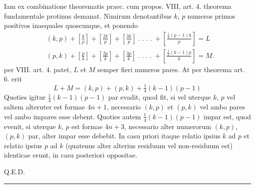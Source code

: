 \documentclass[14pt]{memoir}
\begin{document}
Iam ex combinatione theorematis praec. cum propos. VIII, art. 4. theorema fundamentale protinus demanat. Nimirum denotantibus \(k\), \(p\) numeros primos positivos inaequales quoscunque, et ponendo 
\begin{align*} &(k,p) + \left[\tfrac{k}{p}\right] + \left[\tfrac{2k}{p}\right] + \left[\tfrac{3k}{p}\right] \;.\;.\;.\;.\; + \left[\tfrac{\frac{1}{2}(p-1)k}{p}\right] = L \\
&(p,k) + \left[\tfrac{p}{k}\right] + \left[\tfrac{2p}{k}\right] + \left[\tfrac{3p}{k}\right] \;.\;.\;.\;.\; + \left[\tfrac{\frac{1}{2}(k-1)p}{k}\right] = M. \end{align*}
per VIII. art. 4. patet, \(L\) et \(M\) semper fieri numeros pares. At per theorema art. 6. erit 
\[ L + M = (k,p) + (p,k) + \tfrac{1}{4}(k-1)(p-1) \]
Quoties igitur \(\tfrac{1}{4}(k-1)(p-1)\) par evadit, quod fit, si vel uterque \(k\), \(p\) vel saltem alteruter est formae \(4n+1\), necessario \((k, p)\) et \((p, k)\) vel ambo pares vel ambo impares esse debent.  Quoties autem \(\tfrac{1}{4}(k-1)(p-1)\) impar est, quod evenit, si uterque \(k\), \(p\) est formae \(4n+3\), necessario alter numerorum \((k,p)\), \((p,k)\) par, alter impar esse debebit. In casu priori itaque relatio ipsius \(k\) ad \(p\) et relatio ipsius \(p\) ad \(k\) (quatenus alter alterius residuum vel non-residuum est) identicae erunt, in casu posteriori oppositae. 

\qquad Q.E.D. \\[2\baselineskip]
\begin{center}  \rule{2in}{0.5pt} \end{center}
\end{document}

